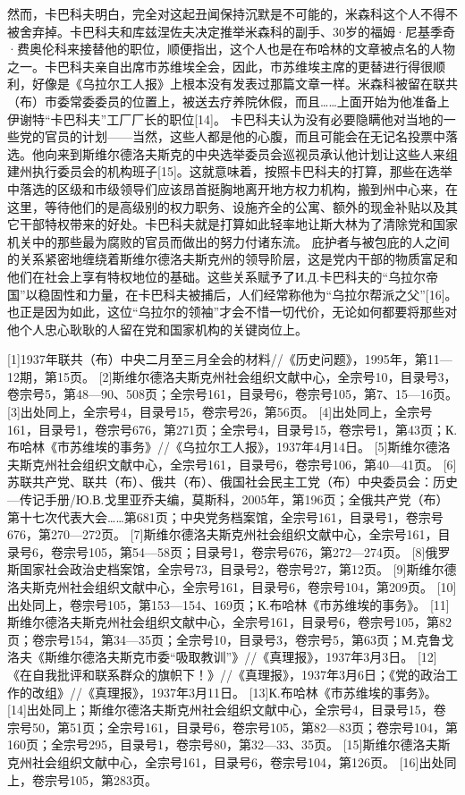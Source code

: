 然而，卡巴科夫明白，完全对这起丑闻保持沉默是不可能的，米森科这个人不得不被舍弃掉。卡巴科夫和库兹涅佐夫决定推举米森科的副手、30岁的福姆·尼基季奇·费奥伦科来接替他的职位，顺便指出，这个人也是在布哈林的文章被点名的人物之一。卡巴科夫亲自出席市苏维埃全会，因此，市苏维埃主席的更替进行得很顺利，好像是《乌拉尔工人报》上根本没有发表过那篇文章一样。米森科被留在联共（布）市委常委委员的位置上，被送去疗养院休假，而且……上面开始为他准备上伊谢特“卡巴科夫”工厂厂长的职位[14]。
卡巴科夫认为没有必要隐瞒他对当地的一些党的官员的计划——当然，这些人都是他的心腹，而且可能会在无记名投票中落选。他向来到斯维尔德洛夫斯克的中央选举委员会巡视员承认他计划让这些人来组建州执行委员会的机构班子[15]。这就意味着，按照卡巴科夫的打算，那些在选举中落选的区级和市级领导们应该昂首挺胸地离开地方权力机构，搬到州中心来，在这里，等待他们的是高级别的权力职务、设施齐全的公寓、额外的现金补贴以及其它干部特权带来的好处。卡巴科夫就是打算如此轻率地让斯大林为了清除党和国家机关中的那些最为腐败的官员而做出的努力付诸东流。
庇护者与被包庇的人之间的关系紧密地缠绕着斯维尔德洛夫斯克州的领导阶层，这是党内干部的物质富足和他们在社会上享有特权地位的基础。这些关系赋予了И.Д.卡巴科夫的“乌拉尔帝国”以稳固性和力量，在卡巴科夫被捕后，人们经常称他为“乌拉尔帮派之父”[16]。也正是因为如此，这位“乌拉尔的领袖”才会不惜一切代价，无论如何都要将那些对他个人忠心耿耿的人留在党和国家机构的关键岗位上。

[1]1937年联共（布）中央二月至三月全会的材料//《历史问题》，1995年，第11—12期，第15页。
[2]斯维尔德洛夫斯克州社会组织文献中心，全宗号10，目录号3，卷宗号5，第48—90、508页；全宗号161，目录号6，卷宗号105，第7、15—16页。
[3]出处同上，全宗号4，目录号15，卷宗号26，第56页。
[4]出处同上，全宗号161，目录号1，卷宗号676，第271页；全宗号4，目录号15，卷宗号1，第43页；К.布哈林《市苏维埃的事务》//《乌拉尔工人报》，1937年4月14日。
[5]斯维尔德洛夫斯克州社会组织文献中心，全宗号161，目录号6，卷宗号106，第40—41页。
[6]苏联共产党、联共（布）、俄共（布）、俄国社会民主工党（布）中央委员会：历史—传记手册/Ю.В.戈里亚乔夫编，莫斯科，2005年，第196页；全俄共产党（布）第十七次代表大会……第681页；中央党务档案馆，全宗号161，目录号1，卷宗号676，第270—272页。
[7]斯维尔德洛夫斯克州社会组织文献中心，全宗号161，目录号6，卷宗号105，第54—58页；目录号1，卷宗号676，第272—274页。
[8]俄罗斯国家社会政治史档案馆，全宗号73，目录号2，卷宗号27，第12页。
[9]斯维尔德洛夫斯克州社会组织文献中心，全宗号161，目录号6，卷宗号104，第209页。
[10]出处同上，卷宗号105，第153—154、169页；К.布哈林《市苏维埃的事务》。
[11]斯维尔德洛夫斯克州社会组织文献中心，全宗号161，目录号6，卷宗号105，第82页；卷宗号154，第34—35页；全宗号10，目录号3，卷宗号5，第63页；М.克鲁戈洛夫《斯维尔德洛夫斯克市委“吸取教训”》//《真理报》，1937年3月3日。
[12]《在自我批评和联系群众的旗帜下！》//《真理报》，1937年3月6日；《党的政治工作的改组》//《真理报》，1937年3月11日。
[13]К.布哈林《市苏维埃的事务》。
[14]出处同上；斯维尔德洛夫斯克州社会组织文献中心，全宗号4，目录号15，卷宗号50，第51页；全宗号161，目录号6，卷宗号105，第82—83页；卷宗号104，第160页；全宗号295，目录号1，卷宗号80，第32—33、35页。
[15]斯维尔德洛夫斯克州社会组织文献中心，全宗号161，目录号6，卷宗号104，第126页。
[16]出处同上，卷宗号105，第283页。
